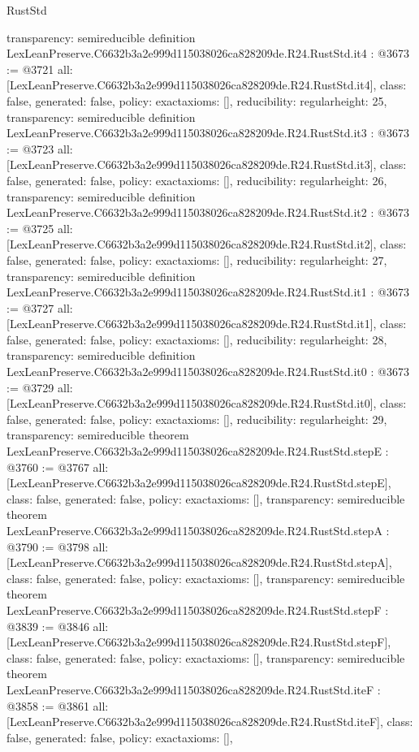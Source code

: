 \begin{lexlean}{RustStd}
\begin{coremodule}
{  transparency: semireducible
}
definition LexLeanPreserve.C6632b3a2e999d115038026ca828209de.R24.RustStd.it4 : @3673 := @3721 {
  all: [LexLeanPreserve.C6632b3a2e999d115038026ca828209de.R24.RustStd.it4],
  class: false,
  generated: false,
  policy: exact{axioms: []},
  reducibility: regular{height: 25},
  transparency: semireducible
}
definition LexLeanPreserve.C6632b3a2e999d115038026ca828209de.R24.RustStd.it3 : @3673 := @3723 {
  all: [LexLeanPreserve.C6632b3a2e999d115038026ca828209de.R24.RustStd.it3],
  class: false,
  generated: false,
  policy: exact{axioms: []},
  reducibility: regular{height: 26},
  transparency: semireducible
}
definition LexLeanPreserve.C6632b3a2e999d115038026ca828209de.R24.RustStd.it2 : @3673 := @3725 {
  all: [LexLeanPreserve.C6632b3a2e999d115038026ca828209de.R24.RustStd.it2],
  class: false,
  generated: false,
  policy: exact{axioms: []},
  reducibility: regular{height: 27},
  transparency: semireducible
}
definition LexLeanPreserve.C6632b3a2e999d115038026ca828209de.R24.RustStd.it1 : @3673 := @3727 {
  all: [LexLeanPreserve.C6632b3a2e999d115038026ca828209de.R24.RustStd.it1],
  class: false,
  generated: false,
  policy: exact{axioms: []},
  reducibility: regular{height: 28},
  transparency: semireducible
}
definition LexLeanPreserve.C6632b3a2e999d115038026ca828209de.R24.RustStd.it0 : @3673 := @3729 {
  all: [LexLeanPreserve.C6632b3a2e999d115038026ca828209de.R24.RustStd.it0],
  class: false,
  generated: false,
  policy: exact{axioms: []},
  reducibility: regular{height: 29},
  transparency: semireducible
}
theorem LexLeanPreserve.C6632b3a2e999d115038026ca828209de.R24.RustStd.stepE : @3760 := @3767 {
  all: [LexLeanPreserve.C6632b3a2e999d115038026ca828209de.R24.RustStd.stepE],
  class: false,
  generated: false,
  policy: exact{axioms: []},
  transparency: semireducible
}
theorem LexLeanPreserve.C6632b3a2e999d115038026ca828209de.R24.RustStd.stepA : @3790 := @3798 {
  all: [LexLeanPreserve.C6632b3a2e999d115038026ca828209de.R24.RustStd.stepA],
  class: false,
  generated: false,
  policy: exact{axioms: []},
  transparency: semireducible
}
theorem LexLeanPreserve.C6632b3a2e999d115038026ca828209de.R24.RustStd.stepF : @3839 := @3846 {
  all: [LexLeanPreserve.C6632b3a2e999d115038026ca828209de.R24.RustStd.stepF],
  class: false,
  generated: false,
  policy: exact{axioms: []},
  transparency: semireducible
}
theorem LexLeanPreserve.C6632b3a2e999d115038026ca828209de.R24.RustStd.iteF : @3858 := @3861 {
  all: [LexLeanPreserve.C6632b3a2e999d115038026ca828209de.R24.RustStd.iteF],
  class: false,
  generated: false,
  policy: exact{axioms: []},
}
\end{coremodule}
\end{lexlean}
